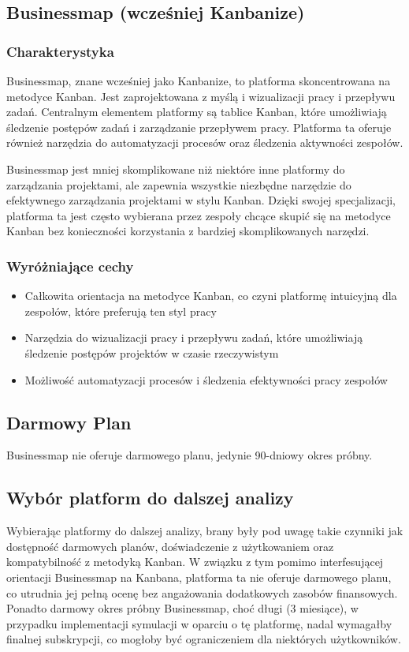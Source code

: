 \subsection{Businessmap (wcześniej Kanbanize)}
\subsubsection*{Charakterystyka}
Businessmap, znane wcześniej jako Kanbanize, to platforma skoncentrowana na metodyce Kanban. Jest zaprojektowana z myślą i wizualizacji pracy i przepływu zadań. Centralnym elementem platformy są tablice Kanban, które umożliwiają
śledzenie postępów zadań i zarządzanie przepływem pracy. Platforma ta oferuje również narzędzia do automatyzacji procesów oraz śledzenia aktywności zespołów.

Businessmap jest mniej skomplikowane niż niektóre inne platformy do zarządzania projektami, ale zapewnia wszystkie niezbędne narzędzie do efektywnego zarządzania projektami w stylu Kanban. Dzięki swojej specjalizacji, platforma
ta jest często wybierana przez zespoły chcące skupić się na metodyce Kanban bez konieczności korzystania z bardziej skomplikowanych narzędzi.
\subsubsection*{Wyróżniające cechy}
\begin{itemize}
    \item Całkowita orientacja na metodyce Kanban, co czyni platformę intuicyjną dla zespołów, które preferują ten styl pracy
    \item Narzędzia do wizualizacji pracy i przepływu zadań, które umożliwiają śledzenie postępów projektów w czasie rzeczywistym
    \item Możliwość automatyzacji procesów i śledzenia efektywności pracy zespołów
\end{itemize}
\subsection*{Darmowy Plan}
Businessmap nie oferuje darmowego planu, jedynie 90-dniowy okres próbny.

\subsection*{Wybór platform do dalszej analizy}
Wybierając platformy do dalszej analizy, brany były pod uwagę takie czynniki jak dostępność darmowych planów, doświadczenie z użytkowaniem oraz kompatybilność z metodyką Kanban. W związku z tym pomimo interfesującej orientacji
Businessmap na Kanbana, platforma ta nie oferuje darmowego planu, co utrudnia jej pełną ocenę bez angażowania dodatkowych zasobów finansowych. Ponadto darmowy okres próbny Businessmap, choć długi (3 miesiące), w przypadku implementacji
symulacji w oparciu o tę platformę, nadal wymagałby finalnej subskrypcji, co mogłoby być ograniczeniem dla niektórych użytkowników.

